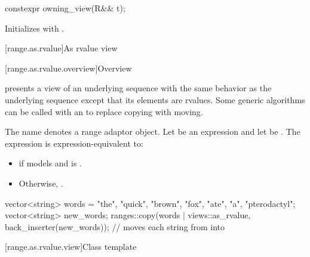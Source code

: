 %
\begin{itemdecl}
constexpr owning_view(R&& t);
\end{itemdecl}

\begin{itemdescr}
\pnum
\effects
Initializes  with .
\end{itemdescr}

[range.as.rvalue]{As rvalue view}

[range.as.rvalue.overview]{Overview}

\pnum
{} presents a view of an underlying sequence
with the same behavior as the underlying sequence
except that its elements are rvalues.
Some generic algorithms can be called with an 
to replace copying with moving.

\pnum
{}%
The name  denotes
a range adaptor object.
Let  be an expression and let  be .
The expression  is expression-equivalent to:
\begin{itemize}
\item
{} if
 models  and
 is .
\item
Otherwise, .
\end{itemize}

\pnum
\begin{example}
\begin{codeblock}
vector<string> words = {"the", "quick", "brown", "fox", "ate", "a", "pterodactyl"};
vector<string> new_words;
ranges::copy(words | views::as_rvalue, back_inserter(new_words));
  // moves each string from  into 
\end{codeblock}
\end{example}

[range.as.rvalue.view]{Class template }

